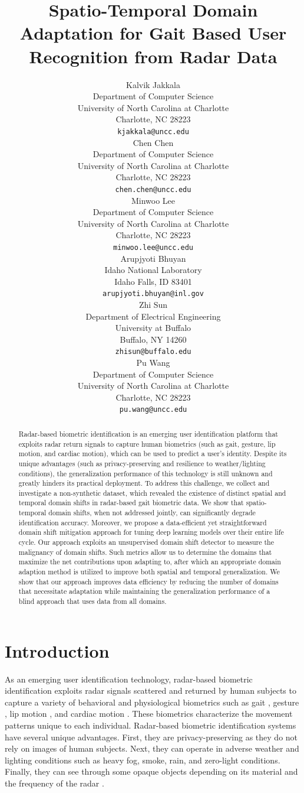 \documentclass{article}
\title{Spatio-Temporal Domain Adaptation for Gait Based User Recognition from Radar Data}
\author{
  Kalvik Jakkala \\
  Department of Computer Science\\
  University of North Carolina at Charlotte\\
  Charlotte, NC 28223 \\
  \texttt{kjakkala@uncc.edu} \\
  \And
  Chen Chen \\
  Department of Computer Science\\
  University of North Carolina at Charlotte\\
  Charlotte, NC 28223 \\
  \texttt{chen.chen@uncc.edu} \\
  \And
  Minwoo Lee \\
  Department of Computer Science\\
  University of North Carolina at Charlotte\\
  Charlotte, NC 28223 \\
  \texttt{minwoo.lee@uncc.edu} \\
  \And
  Arupjyoti	Bhuyan \\
  Idaho National Laboratory \\
  Idaho Falls, ID 83401 \\
  \texttt{arupjyoti.bhuyan@inl.gov} \\
  \And
  Zhi Sun \\
  Department of Electrical Engineering \\
  University at Buffalo	\\
  Buffalo, NY 14260 \\
  \texttt{zhisun@buffalo.edu} \\
  \And
  Pu Wang \\
  Department of Computer Science\\
  University of North Carolina at Charlotte\\
  Charlotte, NC 28223 \\
  \texttt{pu.wang@uncc.edu} \\
}
\begin{document}
\maketitle

\begin{abstract}
Radar-based biometric identification is an emerging user identification platform that exploits radar return signals to capture human biometrics (such as gait, gesture, lip motion, and cardiac motion), which can be used to predict a user's identity. Despite its unique advantages (such as privacy-preserving and resilience to weather/lighting conditions), the generalization performance of this technology is still unknown and greatly hinders its practical deployment. To address this challenge, we collect and investigate a non-synthetic dataset, which revealed the existence of distinct spatial and temporal domain shifts in radar-based gait biometric data. We show that spatio-temporal domain shifts, when not addressed jointly, can significantly degrade identification accuracy. Moreover, we propose a data-efficient yet straightforward domain shift mitigation approach for tuning deep learning models over their entire life cycle. Our approach exploits an unsupervised domain shift detector to measure the malignancy of domain shifts. Such metrics allow us to determine the domains that maximize the net contributions upon adapting to, after which an appropriate domain adaption method is utilized to improve both spatial and temporal generalization. We show that our approach improves data efficiency by reducing the number of domains that necessitate adaptation while maintaining the generalization performance of a blind approach that uses data from all domains.
\end{abstract}


\section{Introduction}
\label{intro}
As an emerging user identification technology, radar-based biometric identification exploits radar signals scattered and returned by human subjects to capture a variety of behavioral and physiological biometrics such as gait \cite{wifigait1,pokkunuru2018neuralwave, jakkala2019deep, janakaraj2019star, pegoraro2020multi, huang2020multi, lang2019person, abdulatif2018study, qiao2020human, lang2019joint}, gesture \cite{gesture1,gesture2}, lip motion \cite{lip1,lip2}, and cardiac motion \cite{heart1,heart2}. These biometrics characterize the movement patterns unique to each individual. Radar-based biometric identification systems have several unique advantages. First, they are privacy-preserving as they do not rely on images of human subjects. Next, they can operate in adverse weather and lighting conditions such as heavy fog, smoke, rain, and zero-light conditions. Finally, they can see through some opaque objects depending on its material and the frequency of the radar \cite{wall1,wall2}.
\end{document}
